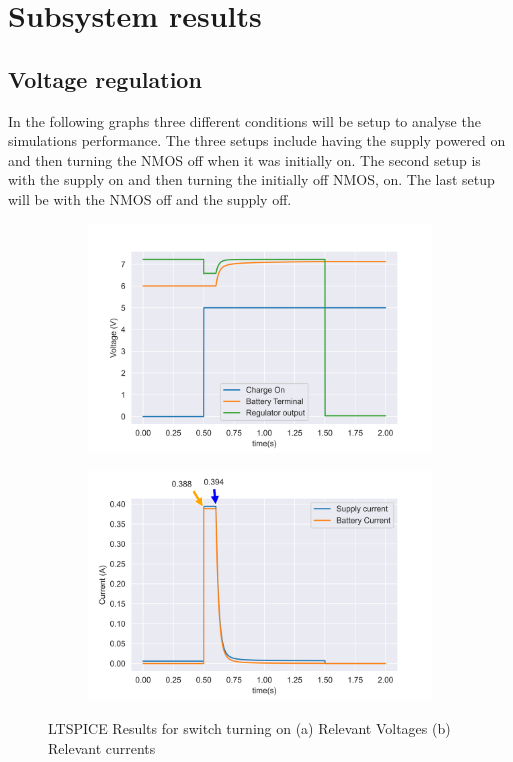 \chapter{Subsystem results}\label{chap:res}
\section{Voltage regulation}
In the following graphs three different conditions will be setup to analyse the simulations performance. The three setups include having the supply powered on and then turning the NMOS off when it was initially on. The second setup is with the supply on and then turning the initially off NMOS, on. The last setup will be with the NMOS off and the supply off.

\begin{figure}[!htb]
 \footnotesize
 \centering
    \begin{subfigure}[]{0.42\textwidth}
              \centering
  		\includegraphics[width=1\linewidth]{./Figures/A2-1.png}
		    \caption{} \label{subfig:A2-1}
     \end{subfigure}
     \begin{subfigure}[]{0.42\textwidth}
             \centering
  		\includegraphics[width=1\linewidth]{./Figures/A2-2.png}
		   \caption{ } \label{subfig:A2-2}
     \end{subfigure}
   \caption[{LTSPICE switch turning on results}]{LTSPICE Results for switch turning on  (a)  Relevant Voltages (b)  Relevant currents  }
    \label{fig:spiceReg}
 \end{figure}

